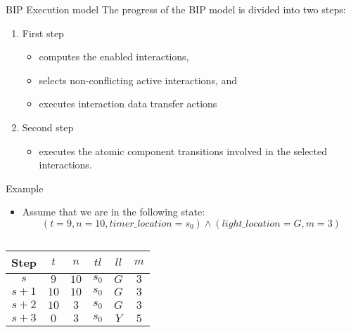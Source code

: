 \begin{frame}{BIP Execution model}
   The progress of the BIP model is divided into two steps:
    \begin{enumerate}
      \item First step \begin{itemize}
          \item computes the enabled interactions, \item selects non-conflicting active interactions, 
          and \item executes interaction data transfer actions\end{itemize}
	 \item Second step 
  \begin{itemize}  \item executes the atomic component transitions involved in the selected interactions. \end{itemize}
	\end{enumerate} 
\end{frame}

\begin{frame}{Example}
\begin{itemize}
\item
 Assume that we are in the following state:
 $$(t = 9, n = 10, timer\_location = s_0) \land (light\_location = G, m = 3)$$
 \end{itemize}
 \begin{columns}[c]
  \begin{tabular}{|c|c|c|c|c|c|}
	  \hline
	  Step & $t$ & $n$ & $tl$ & $ll$ & $m$ \\ 
	  \hline
	     $s$ & $9$ & $10$ & $s_0$ & $G$ & $3$ \\
	     \hline
	     $s+1$ & $10$ & $10$ & $s_0$ & $G$ & $3$ \\
	  \hline
	     $s+2$ & $10$ & $3$ & $s_0$ & $G$ & $3$ \\
	  \hline
	  $s+3$ & $0$ & $3$ & $s_0$ & $Y$ & $5$ \\
	  \hline
  \end{tabular}
   \resizebox{0.8\textwidth}{!}{
  
}
 \end{columns}
\end{frame}

